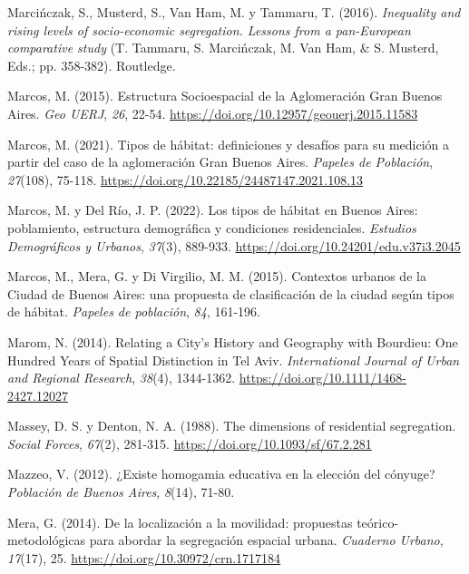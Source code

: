 \documentclass[
  spanish,
  a4paper,%
  chapterprefix=true,%
  DIV=calc,%
  twoside]{scrbook}%
\newlength{\cslhangindent}
\newenvironment{CSLReferences}[2] %
 {\begin{list}{}{%
  \setlength{\itemindent}{0pt}
  \setlength{\leftmargin}{0pt}
  \setlength{\parsep}{0pt}
  \ifodd #1
   \setlength{\leftmargin}{\cslhangindent}
   \setlength{\itemindent}{-1\cslhangindent}
  \fi
  \setlength{\itemsep}{#2\baselineskip}}}
 {\end{list}}
\begin{document}
\begin{CSLReferences}{1}{0}
Marcińczak, S., Musterd, S., Van Ham, M. y Tammaru, T. (2016). \emph{Inequality and rising levels of socio-economic segregation. Lessons from a pan-European comparative study} (T. Tammaru, S. Marcińczak, M. Van Ham, \& S. Musterd, Eds.; pp. 358-382). Routledge.

Marcos, M. (2015). Estructura Socioespacial de la Aglomeración Gran Buenos Aires. \emph{Geo UERJ}, \emph{26}, 22-54. \url{https://doi.org/10.12957/geouerj.2015.11583}

Marcos, M. (2021). Tipos de hábitat: definiciones y desafíos para su medición a partir del caso de la aglomeración Gran Buenos Aires. \emph{Papeles de Población}, \emph{27}(108), 75-118. \url{https://doi.org/10.22185/24487147.2021.108.13}

Marcos, M. y Del Río, J. P. (2022). Los tipos de hábitat en Buenos Aires: poblamiento, estructura demográfica y condiciones residenciales. \emph{Estudios Demográficos y Urbanos}, \emph{37}(3), 889-933. \url{https://doi.org/10.24201/edu.v37i3.2045}

Marcos, M., Mera, G. y Di Virgilio, M. M. (2015). Contextos urbanos de la Ciudad de Buenos Aires: una propuesta de clasificación de la ciudad según tipos de hábitat. \emph{Papeles de población}, \emph{84}, 161-196.

Marom, N. (2014). Relating a City's History and Geography with Bourdieu: One Hundred Years of Spatial Distinction in Tel Aviv. \emph{International Journal of Urban and Regional Research}, \emph{38}(4), 1344-1362. \url{https://doi.org/10.1111/1468-2427.12027}

Massey, D. S. y Denton, N. A. (1988). The dimensions of residential segregation. \emph{Social Forces}, \emph{67}(2), 281-315. \url{https://doi.org/10.1093/sf/67.2.281}

Mazzeo, V. (2012). ¿Existe homogamia educativa en la elección del cónyuge? \emph{Población de Buenos Aires}, \emph{8}(14), 71-80.

Mera, G. (2014). De la localización a la movilidad: propuestas teórico-metodológicas para abordar la segregación espacial urbana. \emph{Cuaderno Urbano}, \emph{17}(17), 25. \url{https://doi.org/10.30972/crn.1717184}


\end{CSLReferences}
\end{document}
